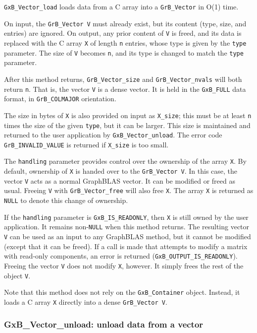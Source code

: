 \verb'GxB_Vector_load' loads data from a C array into a \verb'GrB_Vector' in
O(1) time.

On input, the \verb'GrB_Vector V' must already exist, but its content (type,
size, and entries) are ignored.  On output, any prior content of \verb'V' is
freed, and its data is replaced with the C array \verb'X' of length \verb'n'
entries, whose type is given by the \verb'type' parameter.  The size of
\verb'V' becomes \verb'n', and its type is changed to match the \verb'type'
parameter.

After this method returns, \verb'GrB_Vector_size' and \verb'GrB_Vector_nvals'
will both return \verb'n'.  That is, the vector \verb'V' is a dense vector.
It is held in the \verb'GxB_FULL' data format, in \verb'GrB_COLMAJOR'
orientation.

The size in bytes of \verb'X' is also provided on input as \verb'X_size'; this
must be at least \verb'n' times the size of the given \verb'type', but it can
be larger.  This size is maintained and returned to the user application by
\verb'GxB_Vector_unload'.  The error code \verb'GrB_INVALID_VALUE' is returned
if \verb'X_size' is too small.

The \verb'handling' parameter provides control over the ownership of the array
\verb'X'.  By default, ownership of \verb'X' is handed over to the
\verb'GrB_Vector V'.  In this case, the vector \verb'V' acts as a normal
GraphBLAS vector.  It can be modified or freed as usual.  Freeing \verb'V' with
\verb'GrB_Vector_free' will also free \verb'X'.  The array \verb'X' is returned
as \verb'NULL' to denote this change of ownership.

If the \verb'handling' parameter is \verb'GxB_IS_READONLY', then \verb'X' is
still owned by the user application.  It remains non-\verb'NULL' when this
method returns.  The resulting vector \verb'V' can be used as an input to any
GraphBLAS method, but it cannot be modified (except that it can be freed).
If a call is made that attempts to modify a matrix with read-only components,
an error is returned (\verb'GxB_OUTPUT_IS_READONLY').
Freeing the vector \verb'V' does not modify \verb'X', however.  It simply
frees the rest of the object \verb'V'.

Note that this method does not rely on the \verb'GxB_Container' object.
Instead, it loads a C array \verb'X' directly into a dense \verb'GrB_Vector V'.

\subsubsection{{\sf GxB\_Vector\_unload:} unload data from a vector}
\label{vector_unload}

